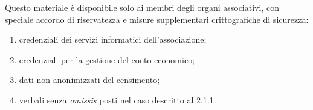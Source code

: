 Questo materiale è disponibile solo ai membri degli organi associativi,
con speciale accordo di riservatezza e misure supplementari
crittografiche di sicurezza:

\begin{enumerate}
    \item
        credenziali dei servizi informatici dell'associazione;
    \item
        credenziali per la gestione del conto economico;
    \item
        dati non anonimizzati del censimento;
    \item
        verbali senza \emph{omissis} posti nel caso descritto al 2.1.1.
\end{enumerate}


